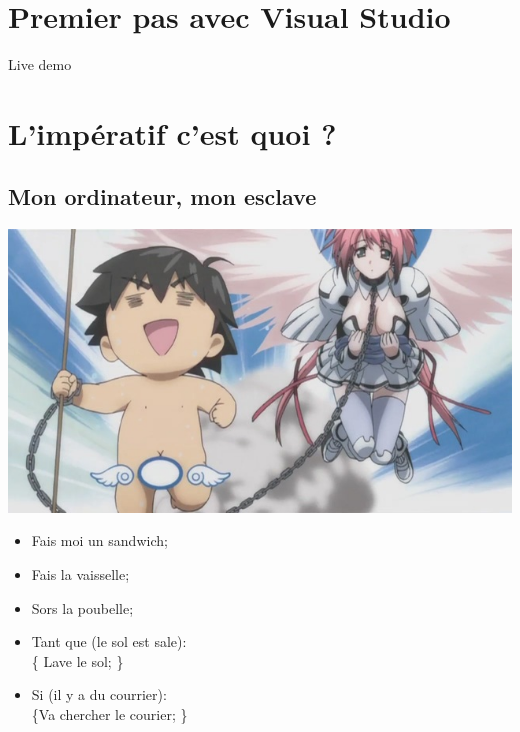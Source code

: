 \documentclass{beamer}
\begin{document}
\section{Premier pas avec Visual Studio}

\begin{frame}
Live demo
\end{frame}


\section{L'imp\'eratif c'est quoi ?}
\subsection{Mon ordinateur, mon esclave}
\begin{frame}
  \begin{center}
    \includegraphics[scale=0.35]{images/esclave.jpg}
  \end{center}
\end{frame}

\begin{frame}
    \begin{itemize}

	\item<1-> Fais moi un sandwich;
	\item<2-> Fais la vaisselle;
	\item<3-> Sors la poubelle;

	\item<4-> Tant que (le sol est sale): \\
	\{ Lave le sol; \} 

	\item<5-> Si (il y a du courrier):\\
	 \{Va chercher le courier; \} 
    \end{itemize}
\end{frame}
\end{document}
